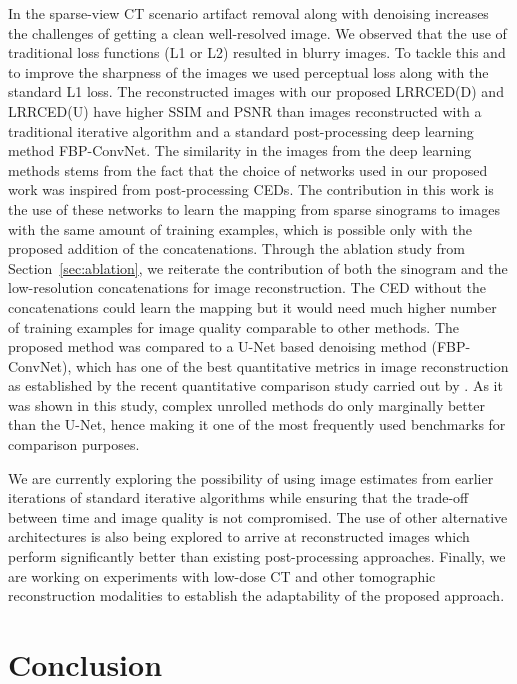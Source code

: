 In the sparse-view \ac{CT} scenario artifact removal along with denoising increases the challenges of getting a clean well-resolved image. We observed that the use of traditional loss functions (L1 or L2) resulted in blurry images. To tackle this and to improve the sharpness of the images we used perceptual loss along with the standard L1 loss. The reconstructed images with our proposed \ac{LRRCED}(D) and \ac{LRRCED}(U) have higher \ac{SSIM} and \ac{PSNR} than images reconstructed with a traditional iterative algorithm and a standard post-processing deep learning method FBP-ConvNet. The similarity in the images from the deep learning methods stems from the fact that the choice of networks used in our proposed work was inspired from post-processing \acp{CED}. The contribution in this work is the use of these networks to learn the mapping from sparse sinograms to images with the same amount of training examples, which is possible only with the proposed addition of the concatenations. Through the ablation study from Section~\ref{sec:ablation}, we reiterate the contribution of both the sinogram and the low-resolution concatenations for image reconstruction. The \ac{CED} without the concatenations could learn the mapping but it would need much higher number of training examples for image quality comparable to other methods. The proposed method was compared to a U-Net based denoising method (FBP-ConvNet), which has one of the best quantitative metrics in image reconstruction as established by the recent quantitative comparison study carried out by \cite{leuschner2021quantitative}. As it was shown in this study, complex unrolled methods do only marginally better than the U-Net, hence making it one of the most frequently used benchmarks for comparison purposes. 

We are currently exploring the possibility of using image estimates from earlier iterations of standard iterative algorithms while ensuring that the trade-off between time and image quality is not compromised. The use of other alternative architectures is also being explored to arrive at reconstructed images which perform significantly better than existing post-processing approaches. Finally, we are working on experiments with low-dose \ac{CT} and other tomographic reconstruction modalities to establish the adaptability of the proposed approach.  

\section{Conclusion} \label{sec:conclusion}

